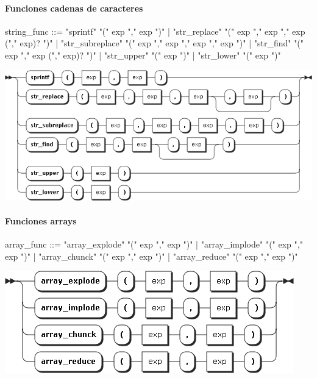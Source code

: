 \paragraph{Funciones cadenas de caracteres}
\begin{myverbatim}      
string_func ::=   "sprintf" "(" exp "," exp ")"
               |  "str_replace" "(" exp "," exp "," exp ("," exp)? ")"
               |  "str_subreplace" "(" exp "," exp "," exp "," exp ")"
               |  "str_find" "(" exp "," exp ("," exp)? ")"
               |  "str_upper" "(" exp ")"
               |  "str_lower" "(" exp ")"
\end{myverbatim}  
\begin{center}
\includegraphics[scale=0.4]{diagram/string_func.png} \\
\end{center}

\paragraph{Funciones arrays}
\begin{multicols}{2}
\begin{myverbatim}      
array_func ::= 
 "array_explode" "(" exp "," exp ")"
 |  "array_implode" "(" exp "," exp ")"
 |  "array_chunck" "(" exp "," exp ")"
 |  "array_reduce" "(" exp "," exp ")"
\end{myverbatim}  
\columnbreak	
\begin{center}
\includegraphics[scale=0.5]{diagram/array_func.png} \\
\end{center}
\end{multicols}


